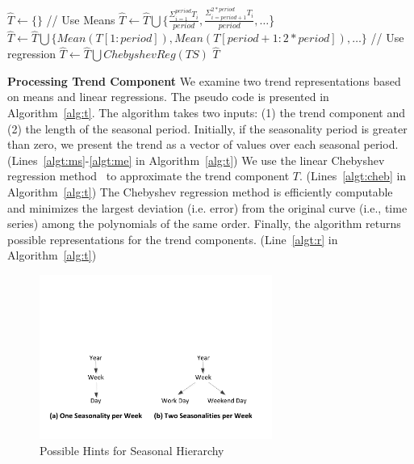 \documentclass[10pt,conference,letterpaper]{IEEEtran}
\begin{document}
 

\begin{algorithm}[tp]
\caption{Find Possible Representations for Trend}
\label{alg:t}
\begin{algorithmic}[1]
\State $\hat{T} \gets  \{\}$
  \label{algt:ms}
\State // Use Means
\State $\hat{T} \gets \hat{T} \bigcup \{ \frac{\Sigma_{i=1}^{period} {T_i}}{period}, \frac{\Sigma_{i=period+1}^{2*period} {T_i}}{period}, \dots $\}
\State $\hat{T} \gets \hat{T} \bigcup  \{ Mean(T[1:period]), Mean(T[period+1:2*period]),  \dots \} $
\EndIf  \label{algt:me}
\State // Use regression
\State $\hat{T} \gets \hat{T} \bigcup ChebyshevReg(TS)$ \label{algt:cheb}
 $\hat{T}$\label{algt:r}
\EndProcedure
\end{algorithmic}
\end{algorithm}

{\bf Processing Trend Component}
\label{sec:nonseasonal}
We examine two  trend representations based on means and linear regressions. The pseudo code is presented in Algorithm~\ref{alg:t}. The algorithm takes two inputs: (1) the trend component and (2) the length of the seasonal period. Initially, if the seasonality period is greater than zero,  we present the trend as a vector of  values over each seasonal period. (Lines~\ref{algt:ms}-\ref{algt:me} in Algorithm~\ref{alg:t}) 
We use  the linear Chebyshev regression method~\cite{cheb} to approximate the trend component $T$. (Lines~\ref{algt:cheb} in Algorithm~\ref{alg:t}) The Chebyshev regression method is efficiently computable and 
minimizes the largest deviation (i.e. error) from the original curve (i.e., time series) among the polynomials of the same order. Finally, the algorithm returns possible representations for the trend components. (Line~\ref{algt:r} in Algorithm~\ref{alg:t})
\begin{figure}
\center
\includegraphics[width=3.0in]{figs/hints.pdf}
\caption{Possible Hints for Seasonal Hierarchy}
\label{fig:hints}
\end{figure}
\end{document}
